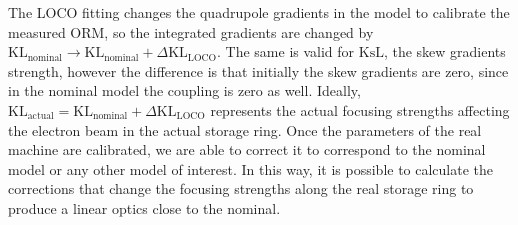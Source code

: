 The LOCO fitting changes the quadrupole gradients in the model to calibrate the measured ORM, so the integrated gradients are changed by $\mathrm{KL}_{\mathrm{nominal}} \rightarrow \mathrm{KL}_{\mathrm{nominal}} + \Delta\mathrm{KL}_{\mathrm{LOCO}}$. The same is valid for $\mathrm{KsL}$, the skew gradients strength, however the difference is that initially the skew gradients are zero, since in the nominal model the coupling is zero as well. Ideally, $\mathrm{KL}_{\mathrm{actual}} = \mathrm{KL}_{\mathrm{nominal}} + \Delta\mathrm{KL}_{\mathrm{LOCO}}$ represents the actual focusing strengths affecting the electron beam in the actual storage ring. Once the parameters of the real machine are calibrated, we are able to correct it to correspond to the nominal model or any other model of interest. In this way, it is possible to calculate the corrections that change the focusing strengths along the real storage ring to produce a linear optics close to the nominal.

